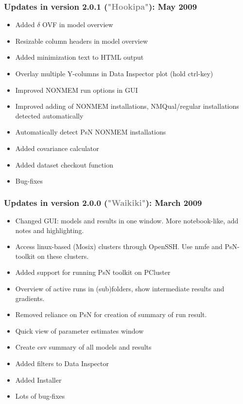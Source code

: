 \documentclass[a4,11pt]{report} \usepackage[pdftex]{graphicx}
\begin{document}
{{{\subsubsection*{Updates in version 2.0.1
(\textcolor{Grey}{"Hookipa"}): May 2009}
\begin{itemize} \scriptsize
  \item Added $\delta$ OVF in model overview
  \item Resizable column headers in model overview
  \item Added minimization text to HTML output
  \item Overlay multiple Y-columns in Data Inspector plot (hold
ctrl-key)
  \item Improved NONMEM run options in GUI
  \item Improved adding of NONMEM installations, NMQual/regular
installations detected automatically
  \item Automatically detect PsN NONMEM installations
  \item Added covariance calculator
  \item Added dataset checkout function
  \item Bug-fixes
\end{itemize}
\subsubsection*{Updates in version 2.0.0
(\textcolor{Grey}{"Waikiki"}): March 2009}
\begin{itemize} \scriptsize
  \item Changed GUI: models and results in one window. More
notebook-like, add notes and highlighting.
  \item Access linux-based (Mosix) clusters through OpenSSH. Use nmfe
and PsN-toolkit on these clusters.
  \item Added support for running PsN toolkit on PCluster
  \item Overview of active runs in (sub)folders, show intermediate
results and gradients.
  \item Removed reliance on PsN for creation of summary of run result.
  \item Quick view of parameter estimates window
  \item Create csv summary of all models and results
  \item Added filters to Data Inspector
  \item Added Installer
  \item Lots of bug-fixes
\end{itemize}
}}}
\end{document}

